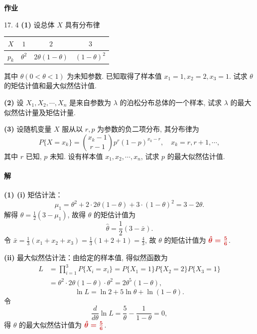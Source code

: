\documentclass[11pt, UTF8]{ctexart}
\newcommand{\ans}[1]{{\color{fred}\boldsymbol{#1}}}
\begin{document}
\begin{center}
    {\LARGE \bfseries \color{fblue} 作业}
\end{center}

\begin{problem}{1}{7. 4}
\textbf{(1)} 设总体 \(X\) 具有分布律
\begin{center}
\begin{tabular}{c|ccc}
\(X\) & \(1\) & \(2\) & \(3\) \\ \hline
\(p_k\) & \(\theta^2\) & \(2\theta(1-\theta)\) & \((1-\theta)^2\)
\end{tabular}
\end{center}
其中 \(\theta(0<\theta<1)\) 为未知参数. 已知取得了样本值 \(x_1=1, x_2=2, x_3=1\). 试求 \(\theta\) 的矩估计值和最大似然估计值.

\textbf{(2)} 设 \(X_1, X_2, \cdots, X_n\) 是来自参数为 \(\lambda\) 的泊松分布总体的一个样本, 试求 \(\lambda\) 的最大似然估计量及矩估计量.

\textbf{(3)} 设随机变量 \(X\) 服从以 \(r, p\) 为参数的负二项分布, 其分布律为
\[ P\{X=x_k\} = \binom{x_k-1}{r-1} p^r (1-p)^{x_k-r}, \quad x_k = r, r+1, \cdots, \]
其中 \(r\) 已知, \(p\) 未知. 设有样本值 \(x_1, x_2, \cdots, x_n\), 试求 \(p\) 的最大似然估计值.
\end{problem}

\paragraph{\color{fblue}解}
\textbf{(1) (i)} 矩估计法：
\[ \mu_1 = \theta^2 + 2 \cdot 2\theta(1-\theta) + 3 \cdot (1-\theta)^2 = 3 - 2\theta. \]
解得 \(\theta = \frac{1}{2}(3 - \mu_1)\), 故得 \(\theta\) 的矩估计值为
\[ \hat{\theta} = \frac{1}{2}(3 - \bar{x}). \]
令 \(\bar{x} = \frac{1}{3}(x_1 + x_2 + x_3) = \frac{1}{3}(1+2+1) = \frac{4}{3}\), 故 \(\theta\) 的矩估计值为 \(\ans{\hat{\theta} = \frac{5}{6}}\).

\textbf{(ii)} 最大似然估计法：由给定的样本值, 得似然函数为
\begin{align*}
L &= \prod_{i=1}^3 P\{X_i = x_i\} = P\{X_1 = 1\}P\{X_2 = 2\}P\{X_3 = 1\} \\
  &= \theta^2 \cdot 2\theta(1-\theta) \cdot \theta^2 = 2\theta^5(1-\theta),
\end{align*}
\[ \ln L = \ln 2 + 5\ln \theta + \ln(1-\theta). \]
令
\[ \frac{d}{d\theta}\ln L = \frac{5}{\theta} - \frac{1}{1-\theta} = 0, \]
得 \(\theta\) 的最大似然估计值为 \(\ans{\hat{\theta} = \frac{5}{6}}\).
\end{document}
